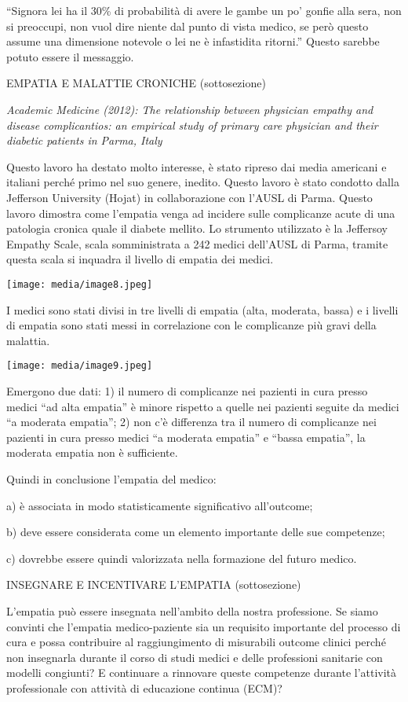 \documentclass[]{article}
\begin{document}
``Signora lei ha il 30\% di probabilità di avere le gambe un po' gonfie
alla sera, non si preoccupi, non vuol dire niente dal punto di vista
medico, se però questo assume una dimensione notevole o lei ne è
infastidita ritorni.'' Questo sarebbe potuto essere il messaggio.

EMPATIA E MALATTIE CRONICHE (sottosezione)

\emph{Academic Medicine (2012): The relationship between physician
empathy and disease complicantios: an empirical study of primary care
physician and their diabetic patients in Parma, Italy}

Questo lavoro ha destato molto interesse, è stato ripreso dai media
americani e italiani perché primo nel suo genere, inedito. Questo lavoro
è stato condotto dalla Jefferson University (Hojat) in collaborazione
con l'AUSL di Parma. Questo lavoro dimostra come l'empatia venga ad
incidere sulle complicanze acute di una patologia cronica quale il
diabete mellito. Lo strumento utilizzato è la Jeffersoy Empathy Scale,
scala somministrata a 242 medici dell'AUSL di Parma, tramite questa
scala si inquadra il livello di empatia dei medici.

\texttt{[image: media/image8.jpeg]}

I medici sono stati divisi in tre livelli di empatia (alta, moderata,
bassa) e i livelli di empatia sono stati messi in correlazione con le
complicanze più gravi della malattia.

\texttt{[image: media/image9.jpeg]}

Emergono due dati: 1) il numero di complicanze nei pazienti in cura
presso medici ``ad alta empatia'' è minore rispetto a quelle nei
pazienti seguite da medici ``a moderata empatia''; 2) non c'è differenza
tra il numero di complicanze nei pazienti in cura presso medici ``a
moderata empatia'' e ``bassa empatia'', la moderata empatia non è
sufficiente.

Quindi in conclusione l'empatia del medico:

a) è associata in modo statisticamente significativo all'outcome;

b) deve essere considerata come un elemento importante delle sue
competenze;

c) dovrebbe essere quindi valorizzata nella formazione del futuro
medico.

INSEGNARE E INCENTIVARE L'EMPATIA (sottosezione)

L'empatia può essere insegnata nell'ambito della nostra professione. Se
siamo convinti che l'empatia medico-paziente sia un requisito importante
del processo di cura e possa contribuire al raggiungimento di misurabili
outcome clinici perché non insegnarla durante il corso di studi medici e
delle professioni sanitarie con modelli congiunti? E continuare a
rinnovare queste competenze durante l'attività professionale con
attività di educazione continua (ECM)?
\end{document}
